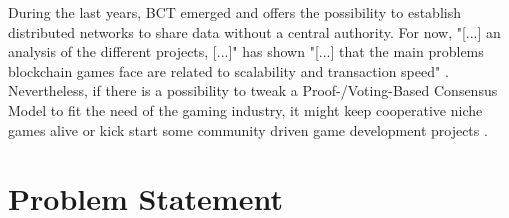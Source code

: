 During the last years, \gls{BCT} emerged and offers the possibility to establish distributed networks to share data without a central authority.
For now, "[...] an analysis of the different projects, [...]" has shown "[...] that the main problems blockchain games face are related to scalability and transaction speed" \cite[47]{Laneve.2019}.
Nevertheless, if there is a possibility to tweak a Proof-/Voting-Based Consensus Model \cite[3]{Khan.2020} to fit the need of the gaming industry,
it might keep cooperative niche games alive or kick start some community driven game development projects \cite[14]{Laneve.2019}.



\FloatBarrier

\section{Problem Statement}
\label{sec:ProblemStatement}

